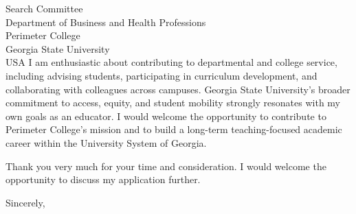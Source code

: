 \documentclass[11pt,letterpaper]{letter}
\begin{document}
\begin{letter}{Search Committee \\
Department of Business and Health Professions \\
Perimeter College \\
Georgia State University \\ USA}
I am enthusiastic about contributing to departmental and college service, including advising students, participating in curriculum development, and collaborating with colleagues across campuses. Georgia State University’s broader commitment to access, equity, and student mobility strongly resonates with my own goals as an educator. I would welcome the opportunity to contribute to Perimeter College’s mission and to build a long-term teaching-focused academic career within the University System of Georgia.

Thank you very much for your time and consideration. I would welcome the opportunity to discuss my application further.

\closing{Sincerely,}

\end{letter}
\end{document}
